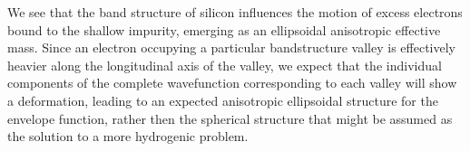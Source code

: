 We see that the band structure of silicon influences the motion of excess
electrons bound to the shallow impurity, emerging as an ellipsoidal anisotropic
effective mass. Since an electron occupying a particular bandstructure valley is
effectively heavier along the longitudinal axis of the valley, we expect that
the individual components of the complete wavefunction corresponding to each
valley will show a deformation, leading to an expected anisotropic ellipsoidal
structure for the envelope function, rather then the spherical structure that
might be assumed as the solution to a more hydrogenic problem.